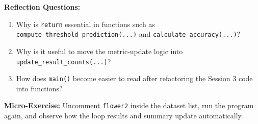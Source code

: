 \textbf{Reflection Questions:}
\begin{enumerate}
    \item Why is \texttt{return} essential in functions such as \texttt{compute\_threshold\_prediction(...)} and \texttt{calculate\_accuracy(...)}?
    \item Why is it useful to move the metric-update logic into \texttt{update\_result\_counts(...)}?
    \item How does \texttt{main()} become easier to read after refactoring the Session 3 code into functions?
\end{enumerate}

\textbf{Micro-Exercise:} Uncomment \texttt{flower2} inside the dataset list, run the program again, and observe how the loop results and summary update automatically.

